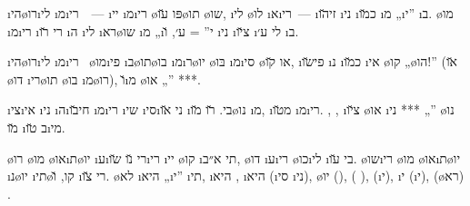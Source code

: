  \i{הי}\o{רו}\i{לי} \i{מ}\i{רי}~~— \i{יי} \i{מ}\i{רי}  \o{פּו} \u{עו}\o{תו}  \o{שו}, \i{לי} \o{לו}  \i{א}\i{רי}~— \i{זי}\u{הו} \i{ני} \i{כ}\u{מו}  \i{מ} „\i{י}” \i{ב}. \o{מו} \i{מ}\i{רי} \i{רי}  \u{רו} \i{ה}  \i{לי} \i{רא}\o{שו}  \i{מ} „\i{י}” = ע׳, \u{ו} \i{ני}  \i{צ}\u{יו}  \i{לי} ע׳ \i{ב}.

 \i{הי}\o{רו}\i{לי} \i{מ}\i{רי}~ \o{מו}\i{פי} \i{ב}\o{תו}\o{בו} \i{מ}\i{ר}\o{יו} \o{בּו} \i{מ}\i{סי} \o{או} \u{קו},  \i{פי}\u{שו} \i{נ} \i{כ}\u{מו}  \i{אי} \o{קו} „\o{הו}!” (\u{או} \o{דו} \i{רי}\o{תו}   \o{בו} \i{מ}\o{רו}), \u{ו}\i{מ}   \o{או} „” ***.

\i{צי}\i{אי} \i{ני}  \i{ה}\i{חי}\u{בו}  \i{מ}\i{רי}  \i{שי}   \i{סי}\i{ני} \u{או} \i{בי}.  \u{רו} \u{מו}\o{נו} \i{מ},   \i{מ}\u{טו}  \i{מ}\i{רי}. , , \i{צ}\u{יו} \o{או} \i{ני} *** „” \o{נו} \u{מו} \i{ב} \u{טו}\i{מי}.

\o{רו} \o{מו} \o{או}\i{ת}\o{יו} \i{ע}\i{רי}  \u{נו} \u{שו}\i{רי} \i{יי} \o{קו} \i{תי}  א״ב, \o{דו} \i{ע}\i{רי} \o{כו}\i{לי} \i{בי}  \u{עו}.  \o{שו}\i{רי}  \o{מו} \o{או}\i{ת}\o{יו} \i{נ}\o{יו} \i{תי}\o{קו}, \u{ו} \i{רי}  \u{צו}.  \o{לא} \i{היא} „\i{י}” \i{תי},   \i{היא} ,  \i{היא}  (\i{סי}  \i{ני}),   \o{יו} (),  ( ),  (\i{י}), \i{י} (\i{י}),  (\o{רא})  .

